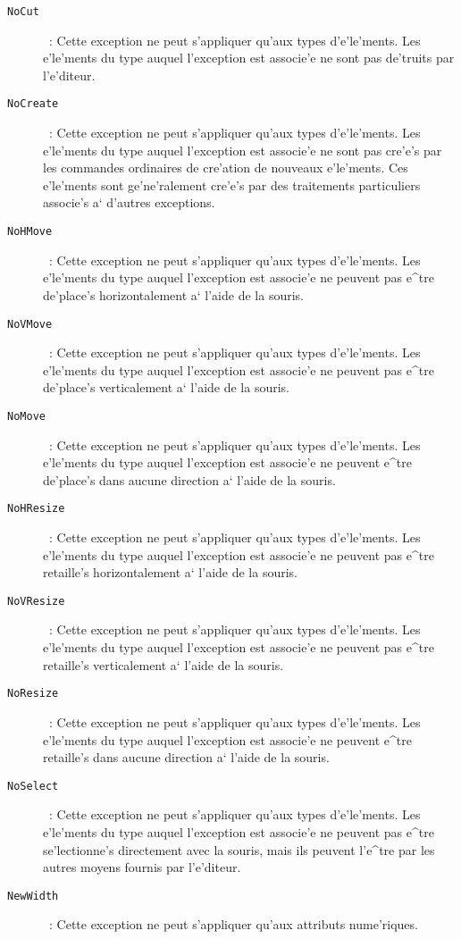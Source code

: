 {\begin{description}
\item[{\tt NoCut}]~: 
 Cette exception ne peut s'appliquer qu'aux types d'e'le'ments.
 Les e'le'ments du type auquel l'exception est associe'e ne sont pas
 de'truits par l'e'diteur.
\item[{\tt NoCreate}]~:
 Cette exception ne peut s'appliquer qu'aux types d'e'le'ments.
 Les e'le'ments du type auquel l'exception est associe'e ne sont pas
 cre'e's par les commandes ordinaires de cre'ation de nouveaux e'le'ments.
 Ces e'le'ments sont ge'ne'ralement cre'e's par des traitements
 particuliers associe's a` d'autres exceptions.
\item[{\tt NoHMove}]~:
 Cette exception ne peut s'appliquer qu'aux types d'e'le'ments.
 Les e'le'ments du type auquel l'exception est associe'e ne peuvent pas
 e^tre de'place's horizontalement a` l'aide de la souris.
\item[{\tt NoVMove}]~:
 Cette exception ne peut s'appliquer qu'aux types d'e'le'ments.
 Les e'le'ments du type auquel l'exception est associe'e ne peuvent pas
 e^tre de'place's verticalement a` l'aide de la souris.
\item[{\tt NoMove}]~:
 Cette exception ne peut s'appliquer qu'aux types d'e'le'ments.
 Les e'le'ments du type auquel l'exception est associe'e ne peuvent
 e^tre de'place's dans aucune direction a` l'aide de la souris.
\item[{\tt NoHResize}]~:
 Cette exception ne peut s'appliquer qu'aux types d'e'le'ments.
 Les e'le'ments du type auquel l'exception est associe'e ne peuvent pas
 e^tre retaille's horizontalement a` l'aide de la souris.
\item[{\tt NoVResize}]~:
 Cette exception ne peut s'appliquer qu'aux types d'e'le'ments.
 Les e'le'ments du type auquel l'exception est associe'e ne peuvent pas
 e^tre retaille's verticalement a` l'aide de la souris.
\item[{\tt NoResize}]~:
 Cette exception ne peut s'appliquer qu'aux types d'e'le'ments.
 Les e'le'ments du type auquel l'exception est associe'e ne peuvent
 e^tre retaille's dans aucune direction a` l'aide de la souris.
\item[{\tt NoSelect}]~:
 Cette exception ne peut s'appliquer qu'aux types d'e'le'ments.
 Les e'le'ments du type auquel l'exception est associe'e ne peuvent
 pas e^tre se'lectionne's directement avec la souris, mais ils peuvent
 l'e^tre par les autres moyens fournis par l'e'diteur.
\item[{\tt NewWidth}]~:
 Cette exception ne peut s'appliquer qu'aux attributs nume'riques.

\end{description}}
